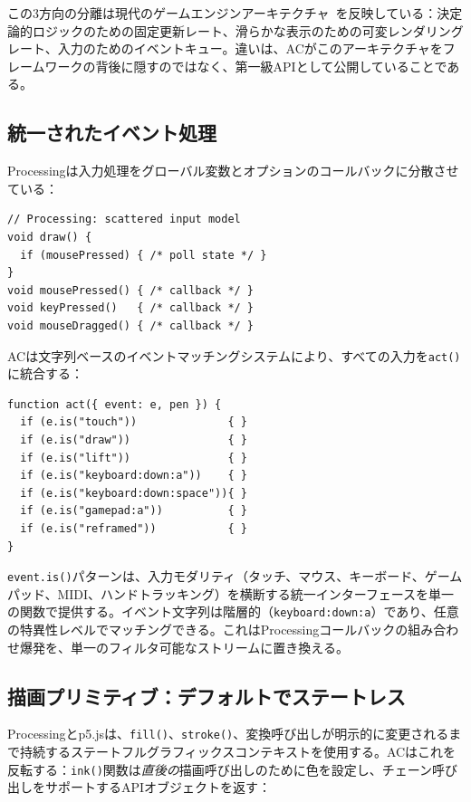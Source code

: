 \documentclass[10pt,letterpaper,twocolumn]{article}
\begin{document}
この3方向の分離は現代のゲームエンジンアーキテクチャ~\citep{nystrom2014game}を反映している：決定論的ロジックのための固定更新レート、滑らかな表示のための可変レンダリングレート、入力のためのイベントキュー。違いは、ACがこのアーキテクチャをフレームワークの背後に隠すのではなく、第一級APIとして公開していることである。

\subsection{統一されたイベント処理}

Processingは入力処理をグローバル変数とオプションのコールバックに分散させている：

\begin{lstlisting}[style=processingstyle]
// Processing: scattered input model
void draw() {
  if (mousePressed) { /* poll state */ }
}
void mousePressed() { /* callback */ }
void keyPressed()   { /* callback */ }
void mouseDragged() { /* callback */ }
\end{lstlisting}

ACは文字列ベースのイベントマッチングシステムにより、すべての入力を\texttt{act()}に統合する：

\begin{lstlisting}[style=acjsstyle]
function act({ event: e, pen }) {
  if (e.is("touch"))              { }
  if (e.is("draw"))               { }
  if (e.is("lift"))               { }
  if (e.is("keyboard:down:a"))    { }
  if (e.is("keyboard:down:space")){ }
  if (e.is("gamepad:a"))          { }
  if (e.is("reframed"))           { }
}
\end{lstlisting}

\texttt{event.is()}パターンは、入力モダリティ（タッチ、マウス、キーボード、ゲームパッド、MIDI、ハンドトラッキング）を横断する統一インターフェースを単一の関数で提供する。イベント文字列は階層的（\texttt{keyboard:down:a}）であり、任意の特異性レベルでマッチングできる。これはProcessingコールバックの組み合わせ爆発を、単一のフィルタ可能なストリームに置き換える。

\subsection{描画プリミティブ：デフォルトでステートレス}

Processingとp5.jsは、\texttt{fill()}、\texttt{stroke()}、変換呼び出しが明示的に変更されるまで持続するステートフルグラフィックスコンテキストを使用する。ACはこれを反転する：\texttt{ink()}関数は\emph{直後の}描画呼び出しのために色を設定し、チェーン呼び出しをサポートするAPIオブジェクトを返す：
\end{document}
